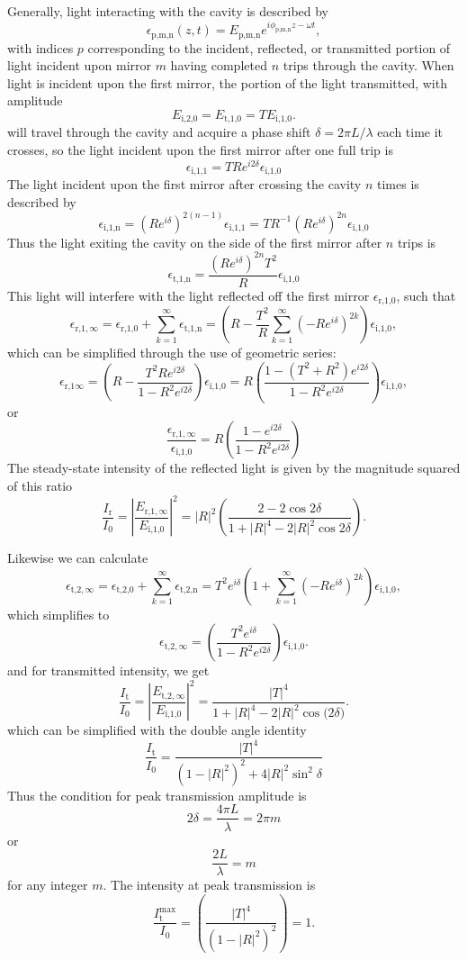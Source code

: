 \documentclass[twocolumn,amsmath,amssymb,pra]{revtex4-2}
\newcommand{\eq}[1]{\begin{equation}#1\end{equation}}
\newcommand{\sub}[1]{_\textrm{#1}}
\begin{document}
Generally, light interacting with the cavity is described by 
\eq{
\epsilon\sub{p,m,n}(z,t) = E\sub{p,m,n}e^{i\phi\sub{p,m,n}z - \omega{}t},
}
with indices $p$ corresponding to the incident, reflected, or transmitted portion of light incident upon mirror $m$ having completed $n$ trips through the cavity. When light is incident upon the first mirror, the portion of the light transmitted, with amplitude 
\eq{
    E\sub{i,2,0} = E\sub{t,1,0} = TE\sub{i,1,0}.
} 
will travel through the cavity and acquire a phase shift $ \delta = 2\pi{}L/\lambda$ each time it crosses, so the light incident upon the first mirror after one full trip is 
\eq{
    \epsilon\sub{i,1,1} = TRe^{i2\delta{}}\epsilon\sub{i,1,0}
}
The light incident upon the first mirror after crossing the cavity $n$ times is described by 
\eq{
    \epsilon{}\sub{i,1,n} = (Re^{i\delta{}})^{2(n-1)}\epsilon\sub{i,1,1} = TR^{-1}(Re^{i\delta{}})^{2n}\epsilon\sub{i,1,0}
}
Thus the light exiting the cavity on the side of the first mirror after $n$ trips is
\eq{
    \epsilon{}\sub{t,1,n} = \frac{(Re^{i\delta{}})^{2n}T^2}{R}\epsilon\sub{i,1,0}
}
This light will interfere with the light reflected off the first mirror $\epsilon\sub{r,1,0}$, such that
\eq{
    \epsilon{}_{\textrm{r,1},\infty} = \epsilon{}\sub{r,1,0} + \sum_{k = 1}^{\infty} \epsilon{}\sub{t,1,n} = \left(R - \frac{T^2}{R}\sum_{k = 1}^\infty(-Re^{i\delta{}})^{2k} \right)\epsilon\sub{i,1,0},
}
which can be simplified through the use of geometric series:
\eq{
    \epsilon{}_{\textrm{r,1}\infty} 
    = \left(R-\frac{T^2Re^{i2\delta{}}} {1-R^2e^{i2\delta{}}}\right)\epsilon\sub{i,1,0}
    = R\left(\frac{1 - (T^2+R^2)e^{i2\delta{}}} {1-R^2e^{i2\delta{}}}\right)\epsilon\sub{i,1,0},
}
or
\eq{
    \frac{\epsilon{}_{\textrm{r,1},\infty}}{\epsilon\sub{i,1,0}}  = R\left(\frac{1 - e^{i2\delta{}}} {1-R^2e^{i2\delta{}}}\right)
}
The steady-state intensity of the reflected light is given by the magnitude squared of this ratio
\eq{
    \frac{I\sub{r}}{I\sub{0}} =
    \left|\frac{E_{\textrm{r,1},\infty}}{E\sub{i,1,0}}\right|^2 = |R|^2\left(\frac{2-2\cos{2\delta{}}}{1+|R|^4-2|R|^2\cos{2\delta{}}}\right).
}

Likewise we can calculate
\eq{
    \epsilon{}_{\textrm{t,2},\infty} = \epsilon{}\sub{t,2,0} + \sum_{k = 1}^{\infty} \epsilon{}\sub{t,2,n} 
    = T^2e^{i\delta{}}\left(1 + \sum_{k = 1}^\infty (-Re^{i\delta{}})^{2k} \right)\epsilon\sub{i,1,0},
}
which simplifies to
\eq{
    \epsilon{}_{\textrm{t,2},\infty} 
    = \left(\frac{T^2e^{i\delta{}}} {1-R^2e^{i2\delta{}}}\right)\epsilon\sub{i,1,0}.
}
and for transmitted intensity, we get
\eq{ \label{I_t}
    \frac{I\sub{t}}{I\sub{0}} = \left|\frac{E_{\textrm{t,2},\infty}}{E\sub{i,1,0}}\right|^2
    = \frac{|T|^4} {1+|R|^4 - 2|R|^2\cos{(2\delta{}})}.
}
which can be simplified with the double angle identity
\eq{
    \frac{I\sub{t}}{I\sub{0}} = \frac{|T|^4} {(1 - |R|^2)^2 + 4|R|^2\sin^2{\delta{}}}
}
Thus the condition for peak transmission amplitude is
\eq{
    2\delta = \frac{4\pi{}L}{\lambda} = 2\pi{}m
}
or
\eq{ \label{peak}
    \frac{2L}{\lambda} = m
}
for any integer $m$. The intensity at peak transmission is
\eq{
    \frac{I\sub{t}^\textrm{max}}{I\sub{0}}
    = \left(\frac{|T|^4}{(1-|R|^2)^2}\right) = 1.
}
\end{document}
